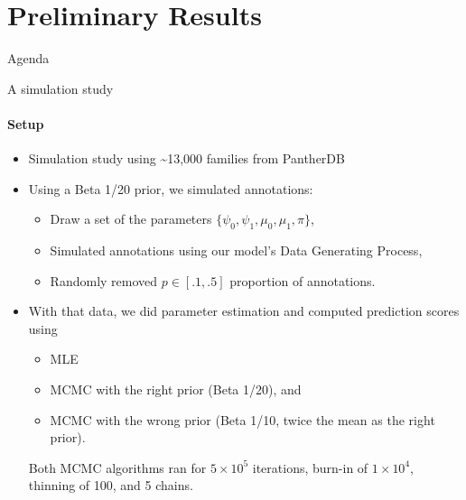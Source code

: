 \documentclass[9pt,ignorenonframetext,aspectratio=169]{beamer}
\providecommand{\tightlist}{%
  \setlength{\itemsep}{0pt}\setlength{\parskip}{0pt}}
\begin{document}
\section{Preliminary Results}\label{preliminary-results}

\begin{frame}[t]{Agenda}

\tableofcontents[currentsection]

\end{frame}

\begin{frame}[t,label=sim-setup]{A simulation study}

\framesubtitle{Setup}

\begin{itemize}
\item
  Simulation study using \textasciitilde{}13,000 families from PantherDB
\item
  Using a Beta 1/20 prior, we simulated annotations:

  \begin{itemize}
  \item
    Draw a set of the parameters
    \(\{\psi_0,\psi_1 ,\mu_0, \mu_1,\pi\}\),
  \item
    Simulated annotations using our model's Data Generating Process,
  \item
    Randomly removed \(p\in [.1, .5]\) proportion of annotations.
  \end{itemize}
\item
  With that data, we did parameter estimation and computed prediction
  scores using

  \begin{itemize}
  \tightlist
  \item
    MLE
  \item
    MCMC with the right prior (Beta 1/20), and
  \item
    MCMC with the wrong prior (Beta 1/10, twice the mean as the right
    prior).
  \end{itemize}

  Both MCMC algorithms ran for \(5\times 10^5\) iterations, burn-in of
  \(1\times 10^4\), thinning of 100, and 5 chains.
\end{itemize}

\hyperlink{sim-convergence}{}

\end{frame}
\end{document}
